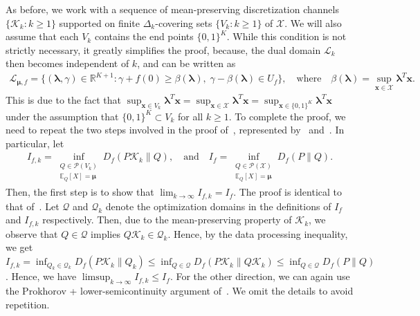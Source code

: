 \documentclass{article}
\theoremstyle{plain}
\theoremstyle{definition}
\newcommand{\R}{\mathbb{R}}
\newcommand{\calP}{\mathcal P}
\newcommand{\calQ}{\mathcal Q}
\newcommand{\calX}{\mathcal X}
\newcommand{\calL}{\mathcal L}
\newcommand{\calK}{\mathcal{K}}
\newcommand{\xvec}{\mathbf{x}}
\newcommand{\qtext}[1]{\quad \text{#1} \quad}
\newcommand{\boldlambda}{\boldsymbol{\lambda}}
\newcommand{\boldmu}{\boldsymbol{\mu}}
\newcommand{\fdivdualdomain}{\calL_{\boldmu, f}}
\begin{document}
As before, we work with a sequence of mean-preserving discretization channels $\{\calK_k: k \geq 1\}$ supported on finite $\Delta_k$-covering sets $\{V_k: k \geq 1\}$ of $\calX$. We will also assume that each $V_k$ contains the end points $\{0,1\}^K$. While this condition is not strictly necessary, it greatly simplifies the proof, because, the dual domain $\calL_k$ then becomes independent of $k$, and can be written as 
\begin{align}
    \fdivdualdomain = \{(\boldlambda, \gamma) \in \R^{K+1}: \gamma + f(0) \geq \beta(\boldlambda), \; \gamma - \beta(\boldlambda) \in U_f \}, \qtext{where} \beta(\boldlambda) = \sup_{\xvec \in \calX} \boldlambda^T \xvec.  
\end{align}
This is due to the fact that $\sup_{\xvec \in V_k} \boldlambda^T\xvec = \sup_{\xvec \in \calX} \boldlambda^T\xvec =   \sup_{\xvec \in \{0,1\}^K} \boldlambda^T\xvec$  under the assumption that $\{0,1\}^K \subset V_k$ for all $k \geq 1$. 
To complete the proof, we need to repeat the two steps involved in the proof of~, represented by~ and~. In particular, let 
\begin{align}
    I_{f,k} = \inf_{\substack{Q \in \calP(V_k) \\ \mathbb{E}_Q[X] = \boldmu }} D_f(P \calK_k \parallel Q), \qtext{and}
    I_f = \inf_{\substack{Q \in \calP(\calX) \\ \mathbb{E}_Q[X] = \boldmu }} D_f(P \parallel Q). 
\end{align}
Then, the first step is to show that $\lim_{k \to \infty} I_{f,k} = I_f$. The proof is identical to that of~. Let $\calQ$ and $\calQ_k$ denote the optimization domains in the definitions of $I_f$ and $I_{f,k}$ respectively. Then, due to the mean-preserving property of $\calK_k$, we observe that $Q \in \calQ$ implies $Q \calK_k \in \calQ_k$. Hence, by the data processing inequality, we get $I_{f,k} = \inf_{Q_k \in \calQ_k} D_f(P \calK_k \parallel Q_k) \leq \inf_{Q \in \calQ} D_f( P \calK_k \parallel Q \calK_k) \leq \inf_{Q \in \calQ} D_f(P \parallel Q)$. Hence, we have $\limsup_{k \to \infty} I_{f,k} \leq I_f$. For the other direction, we can again use the Prokhorov + lower-semicontinuity argument of~. We omit the details to avoid repetition. 
\end{document}
